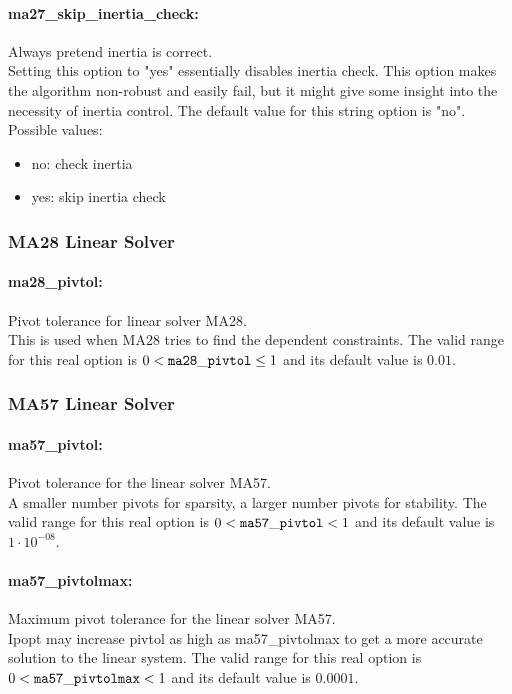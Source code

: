 \paragraph{ma27\_skip\_inertia\_check:}\label{sec:ma27_skip_inertia_check} Always pretend inertia is correct. $\;$ \\
 Setting this option to "yes" essentially disables
inertia check. This option makes the algorithm
non-robust and easily fail, but it might give
some insight into the necessity of inertia
control.
The default value for this string option is "no".
\\ 
Possible values:
\begin{itemize}
   \item no: check inertia
   \item yes: skip inertia check
\end{itemize}

\subsubsection{MA28 Linear Solver}
\label{sec:MA28_Linear_Solver}

\paragraph{ma28\_pivtol:}\label{sec:ma28_pivtol} Pivot tolerance for linear solver MA28. $\;$ \\
 This is used when MA28 tries to find the
dependent constraints. The valid range for this real option is 
$0 <  {\tt ma28\_pivtol } \le 1$
and its default value is $0.01$.


\subsubsection{MA57 Linear Solver}
\label{sec:MA57_Linear_Solver}

\paragraph{ma57\_pivtol:}\label{sec:ma57_pivtol} Pivot tolerance for the linear solver MA57. $\;$ \\
 A smaller number pivots for sparsity, a larger
number pivots for stability. The valid range for this real option is 
$0 <  {\tt ma57\_pivtol } <  1$
and its default value is $1 \cdot 10^{-08}$.


\paragraph{ma57\_pivtolmax:}\label{sec:ma57_pivtolmax} Maximum pivot tolerance for the linear solver MA57. $\;$ \\
 Ipopt may increase pivtol as high as
ma57\_pivtolmax to get a more accurate solution
to the linear system.  The valid range for this real option is 
$0 <  {\tt ma57\_pivtolmax } <  1$
and its default value is $0.0001$.


